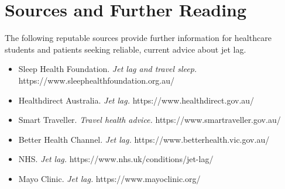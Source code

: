 \section*{Sources and Further Reading}
The following reputable sources provide further information for healthcare students and patients seeking reliable, current advice about jet lag.
\begin{itemize}
    \item Sleep Health Foundation. \textit{Jet lag and travel sleep.} https://www.sleephealthfoundation.org.au/
    \item Healthdirect Australia. \textit{Jet lag.} https://www.healthdirect.gov.au/
    \item Smart Traveller. \textit{Travel health advice.} https://www.smartraveller.gov.au/
    \item Better Health Channel. \textit{Jet lag.} https://www.betterhealth.vic.gov.au/
    \item NHS. \textit{Jet lag.} https://www.nhs.uk/conditions/jet-lag/
    \item Mayo Clinic. \textit{Jet lag.} https://www.mayoclinic.org/
\end{itemize}
